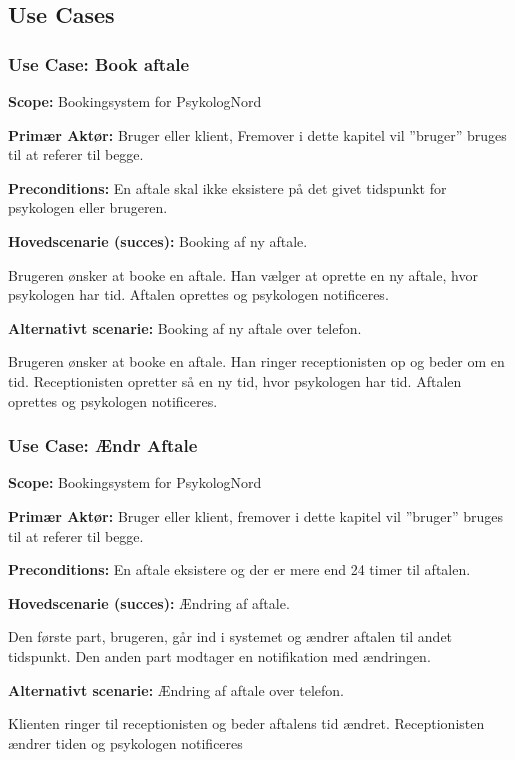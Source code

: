 \subsection{Use Cases}

\subsubsection{Use Case: Book aftale}
{\setlength{\parindent}{0cm}
\textbf{Scope:} Bookingsystem for PsykologNord

\textbf{Primær Aktør:} Bruger eller klient, Fremover i dette kapitel vil ”bruger” bruges til at referer til begge.

\textbf{Preconditions:} En aftale skal ikke eksistere på det givet tidspunkt for psykologen eller brugeren.

\textbf{Hovedscenarie (succes):} Booking af ny aftale.

Brugeren ønsker at booke en aftale. Han vælger at oprette en ny aftale, hvor psykologen har tid. Aftalen oprettes og psykologen notificeres.

\textbf{Alternativt scenarie:} Booking af ny aftale over telefon.

Brugeren ønsker at booke en aftale. Han ringer receptionisten op og beder om en tid. Receptionisten opretter så en ny tid, hvor psykologen har tid. Aftalen oprettes og psykologen notificeres.
}

\subsubsection{Use Case: Ændr Aftale}
{\setlength{\parindent}{0cm}
\textbf{Scope:} Bookingsystem for PsykologNord

\textbf{Primær Aktør:} Bruger eller klient, fremover i dette kapitel vil ”bruger” bruges til at referer til begge. 

\textbf{Preconditions:} En aftale eksistere og der er mere end 24 timer til aftalen.

\textbf{Hovedscenarie (succes):} Ændring af aftale.

Den første part, brugeren, går ind i systemet og ændrer aftalen til andet tidspunkt. Den anden part modtager en notifikation med ændringen. 

\textbf{Alternativt scenarie:} Ændring af aftale over telefon.

Klienten ringer til receptionisten og beder aftalens tid ændret. Receptionisten ændrer tiden og psykologen notificeres
}

